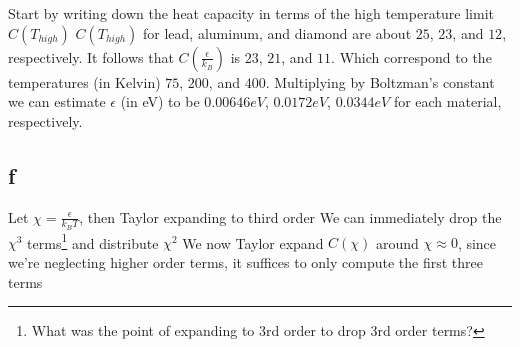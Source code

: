 Start by writing down the heat capacity in terms of the high temperature limit $C(T_{high})$
$C(T_{high})$ for lead, aluminum, and diamond are about $25$, $23$, and $12$, respectively. It follows that $C(\frac{\epsilon}{k_B})$ is $23$, $21$, and $11$. Which correspond to the temperatures (in Kelvin) $75$, $200$, and $400$. Multiplying by Boltzman's constant we can estimate $\epsilon$ (in eV) to be $0.00646eV$, $0.0172eV$, $0.0344eV$ for each material, respectively.
\subsection*{f}
Let $\chi = \frac{\epsilon}{k_B T}$, then
Taylor expanding to third order
We can immediately drop the $\chi^3$ terms\footnote{What was the point of expanding to 3rd order to drop 3rd order terms?} and distribute $\chi^2$
We now Taylor expand $C(\chi)$ around $\chi \approx 0$, since we're neglecting higher order terms, it suffices to only compute the first three terms
